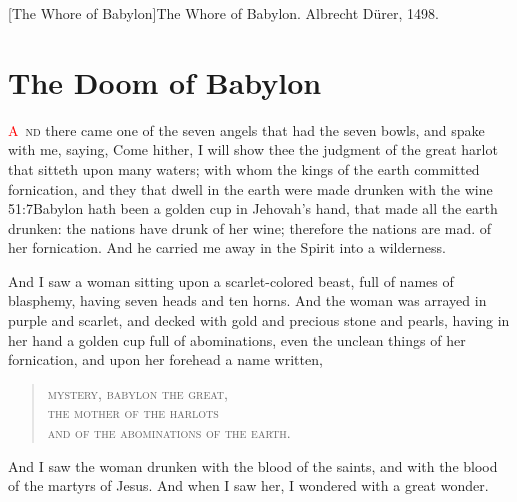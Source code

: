 [The Whore of Babylon]{The Whore of Babylon. Albrecht Dürer, 1498.}

\chapter{The Doom of Babylon}
\lettrine[lines=3,slope=0.5em]{\textcolor{red}{A}}{\ nd} there came one of the seven angels that had the seven bowls, and spake with me, saying, Come hither, I will show thee the judgment of the great harlot that sitteth upon many waters;%
with whom the kings of the earth committed fornication,%
and they that dwell in the earth were made drunken with the wine%
					  {51:7}{Babylon hath been a golden cup in Jehovah’s hand, that made all the earth drunken: the nations have drunk of her wine; therefore the nations are mad.} %
of her fornication.%
And he carried me away in the Spirit into a wilderness. 

And I saw a woman sitting upon a scarlet-colored beast, full of names of blasphemy, having seven heads and ten horns. 
And the woman was arrayed in purple and scarlet, and decked with gold and precious stone and pearls,%
having in her hand a golden cup full of abominations, even the unclean things of her fornication, 
and upon her forehead a name written,%
\begin{verse}
\textsc{%
mystery, babylon the great,\\
the mother of the harlots\\
and of the abominations of the earth.%
}
\end{verse}
And I saw the woman drunken with the blood of the saints, and with the blood of the martyrs of Jesus. And when I saw her, I wondered with a great wonder. 

